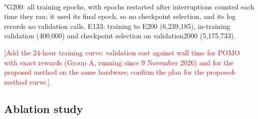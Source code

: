 \documentclass[preprint,12pt,authoryear]{elsarticle}
\newcommand{\placeholder}[1]{\textcolor{red}{[#1]}}
\begin{document}
\begin{table}[t]
\centering
\caption{Training budgets of G200 and E133.}
\label{tab:budget}
\small
{}
\par\smallskip\footnotesize\raggedright \textsuperscript{a}G200: all training epochs, with epochs restarted after interruptions counted each time they ran; it used its final epoch, so no checkpoint selection, and its log records no validation calls. E133: training to E200 (6,239,185), in-training validation (400,000) and checkpoint selection on validation2000 (5,175,733).
\end{table}

\placeholder{Add the 24-hour training curve: validation cost against wall time for POMO with exact rewards (Group A, running since 9 November 2026) and for the proposed method on the same hardware; confirm the plan for the proposed-method curve.}

\subsection{Ablation study}
\label{sec:ablation}
\end{document}
